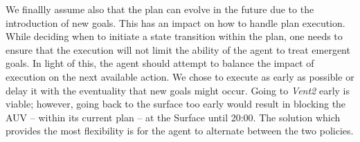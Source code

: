  
%


We finallly assume also that the plan can evolve in the future due to
the introduction of new goals. This has an impact on how to
handle plan execution. While deciding when to initiate a state
transition within the plan, one needs to ensure that the execution
will not limit the ability of the agent to treat emergent goals. In
light of this, the agent should attempt to balance the impact of
execution on the next available action. We chose to execute as early
as possible or delay it with the eventuality that new goals might
occur. Going to \emph{Vent2} early is viable; however, going back to
the surface too early would result in blocking the AUV -- within its
current plan -- at the Surface until 20:00. The solution which
provides the most flexibility is for the agent to alternate between
the two policies.

